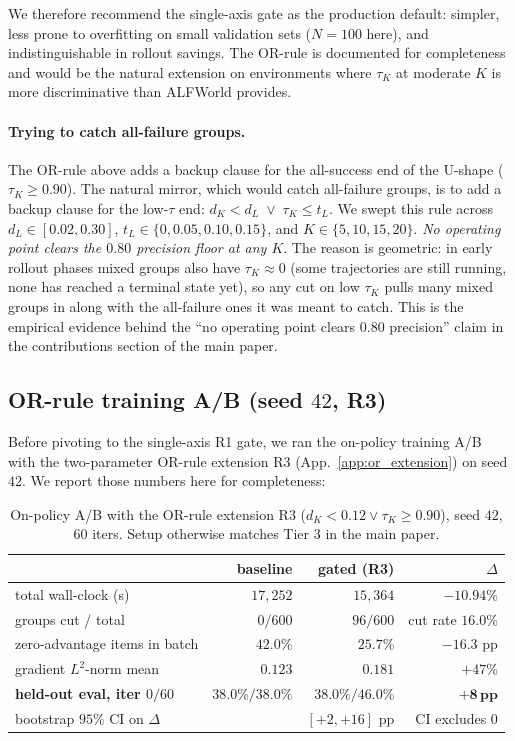 \documentclass{article}
\begin{document}
We therefore recommend the single-axis gate as the production
default: simpler, less prone to overfitting on small validation
sets ($N\!=\!100$ here), and indistinguishable in rollout savings.
The OR-rule is documented for completeness and would be the natural
extension on environments where $\tau_K$ at moderate $K$ is more
discriminative than ALFWorld provides.

\paragraph{Trying to catch all-failure groups.}
The OR-rule above adds a backup clause for the all-success end of
the U-shape ($\tau_K \!\ge\! 0.90$). The natural mirror, which
would catch all-failure groups, is to add a backup clause for the
low-$\tau$ end:
$d_K\!<\!d_L \;\lor\; \tau_K\!\le\!t_L$. We swept this rule
across $d_L \in [0.02, 0.30]$, $t_L \in \{0, 0.05, 0.10, 0.15\}$,
and $K \in \{5, 10, 15, 20\}$. \emph{No operating point clears
the $0.80$ precision floor at any $K$}. The reason is geometric:
in early rollout phases mixed groups also have
$\tau_K \approx 0$ (some trajectories are still running, none
has reached a terminal state yet), so any cut on low $\tau_K$
pulls many mixed groups in along with the all-failure ones it
was meant to catch. This is the empirical evidence behind the
``no operating point clears 0.80 precision'' claim in the
contributions section of the main paper.

\subsection{OR-rule training A/B (seed $42$, R3)}
\label{app:or_training}

Before pivoting to the single-axis R1 gate, we ran the on-policy
training A/B with the two-parameter OR-rule extension R3
(App.~\ref{app:or_extension}) on seed $42$.  We report those
numbers here for completeness:

\begin{table}[h]
\centering
\caption{On-policy A/B with the OR-rule extension R3
($d_K\!<\!0.12 \lor \tau_K\!\ge\!0.90$), seed $42$, $60$ iters.
Setup otherwise matches Tier 3 in the main paper.}
\label{tab:or_training}
\small
\begin{tabular}{lrrr}
\toprule
& baseline & gated (R3) & $\Delta$ \\
\midrule
total wall-clock (s)                  & $17{,}252$ & $15{,}364$ & $-10.94\%$ \\
groups cut / total                    & $0/600$  & $96/600$ & cut rate $16.0\%$ \\
zero-advantage items in batch         & $42.0\%$ & $25.7\%$ & $-16.3$ pp \\
gradient $L^2$-norm mean              & $0.123$ & $0.181$ & $+47\%$ \\
\textbf{held-out eval, iter $0/60$}   & $38.0\%/38.0\%$ & $\mathbf{38.0\%/46.0\%}$ & $\mathbf{+8\,\text{pp}}$ \\
bootstrap $95\%$ CI on $\Delta$       &           & $[+2, +16]$ pp & CI excludes $0$ \\
\bottomrule
\end{tabular}
\end{table}
\end{document}
